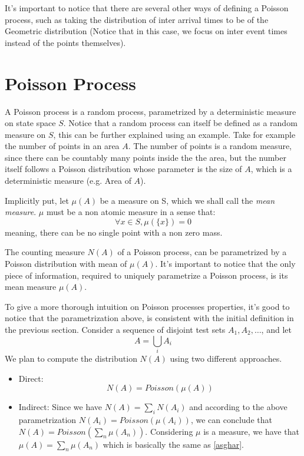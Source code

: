 \documentclass{article}
\begin{document}
It's important to notice that there are several other ways of defining a Poisson process, such as taking the distribution of inter arrival times to be of the Geometric distribution (Notice that in this case, we focus on inter event times instead of the points themselves).

\section{Poisson Process}

A Poisson process is a random process, parametrized by a deterministic measure on state space $S$. Notice that a random process can itself be defined as a random measure on $S$, this can be further explained using an example. Take for example the number of points in an area $A$. The number of points is a random measure, since there can be countably many points inside the the area, but the number itself follows a Poisson distribution whose parameter is the size of $A$, which is a deterministic measure (e.g. Area of $A$).

Implicitly put, let $\mu(A)$ be a measure on S, which we shall call the \textit{mean measure}. $\mu$ must be a non atomic measure in a sense that:
$$ \forall x \in S, \mu(\{x\}) = 0$$
meaning, there can be no single point with a non zero mass.

The counting measure $N(A)$ of a Poisson process, can be parametrized by a Poisson distribution with mean of $\mu(A)$. It's important to notice that the only piece of information, required to uniquely parametrize a Poisson process, is its mean measure $\mu(A)$.

To give a more thorough intuition on Poisson processes properties, it's good to notice that the parametrization above, is consistent with the initial definition in the previous section. Consider a sequence of disjoint test sets $A_1, A_2, \ldots$, and let 
\begin{equation}
A = \bigcup_{i} A_i    
\end{equation}
 We plan to compute the distribution $N(A)$ using two different approaches.

\begin{itemize}
    \item Direct:
        \begin{equation}
            \label{asghar}
            N(A) = Poisson (\mu(A))
        \end{equation}
    \item Indirect: Since we have $N(A) = \sum_i N(A_i)$ and according to the above parametrization $ N(A_i) = Poisson (\mu(A_i))$, we can conclude that $N(A) = Poisson(\sum_n{\mu(A_n)})$. Considering $\mu$ is a measure, we have that $\mu(A) = \sum_n{\mu(A_n)} $ which is basically the same as \ref{asghar}.
\end{itemize}
\end{document}
